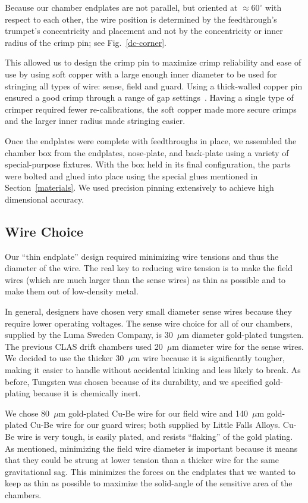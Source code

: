 Because our chamber endplates are not parallel, but oriented at
$\approx 60^{\circ}$ with respect to each other, the wire position is determined
by the feedthrough's trumpet's concentricity and placement and not by
the concentricity or inner radius of the crimp pin; see Fig.~\ref{dc-corner}.

This allowed us to design the crimp pin to maximize crimp reliability
and ease of use by using soft copper with a large enough inner diameter
to be used for stringing all types of wire: sense, field and guard.
Using a thick-walled copper pin ensured a good crimp through a range of gap settings~\cite{sbc}.
Having a single type of crimper required fewer re-calibrations, the soft
copper made more secure crimps and the larger inner radius made
stringing easier.

Once the endplates were complete with feedthroughs in place, 
we assembled the chamber box from the
endplates, nose-plate, and back-plate using a variety of special-purpose
fixtures.  With the box held in its final configuration, the parts were bolted
and glued into place using the special glues mentioned in Section~\ref{materials}.
We used precision pinning extensively to achieve high dimensional accuracy.

\subsection{Wire Choice}

Our ``thin endplate'' design required minimizing wire tensions and
thus the diameter of the wire.  The real key to reducing wire tension is to
make the field wires (which are much larger than the sense wires) as 
thin as possible and to make them out of low-density metal.  

In general, designers have chosen very small diameter sense wires because they
require lower operating voltages.
The sense wire choice for all of our chambers, supplied by the Luma
Sweden Company, is 30~$\mu$m diameter gold-plated tungsten.  
The previous CLAS drift chambers used 20~$\mu$m diameter wire for the
sense wires.  We decided to use the thicker 30~$\mu$m wire because it is 
significantly tougher, making it easier to handle without
accidental kinking and less likely to break.
As before, Tungsten was chosen because of its durability, 
and we specified gold-plating because it is chemically inert.  

We chose 80~$\mu$m gold-plated Cu-Be wire for our field wire and
140~$\mu$m gold-plated Cu-Be wire for our guard wires; both supplied
by Little Falls Alloys. Cu-Be wire is very tough, is easily plated, and resists
``flaking'' of the gold plating. 
As mentioned, minimizing the field wire diameter is important because it means that they 
could be strung at lower tension than a thicker wire for the same gravitational sag.  
This minimizes the forces on the endplates that we wanted to keep as 
thin as possible to maximize the solid-angle of the sensitive area of
the chambers.

